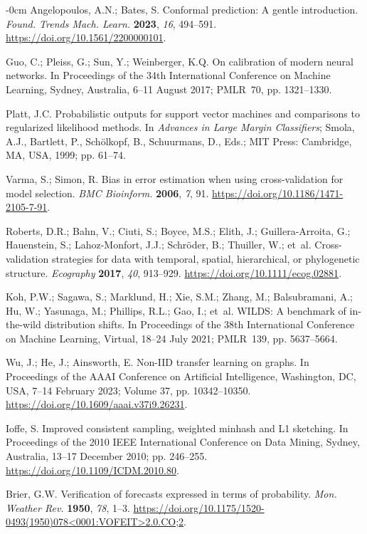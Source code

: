 \documentclass[10pt,a4paper]{article}
\newlength{\extralength}\setlength{\extralength}{3.7cm}
\renewenvironment{thebibliography}[1]{\nolinenumbers\small\list{\arabic{enumiv}.}{\settowidth\labelwidth{999.}\leftmargin\labelwidth\advance\leftmargin\labelsep\usecounter{enumiv}\itemsep 0pt}\sloppy}{\endlist}
\begin{document}
\begin{adjustwidth}{-\extralength}{0cm}
\begin{thebibliography}{999}
 Angelopoulos, A.N.; Bates, S. Conformal prediction: A gentle introduction. \emph{Found. Trends Mach. Learn.} \textbf{2023}, \emph{16}, 494--591. \url{https://doi.org/10.1561/2200000101}.

 Guo, C.; Pleiss, G.; Sun, Y.; Weinberger, K.Q. On calibration of modern neural networks. In Proceedings of the 34th International Conference on Machine Learning, Sydney, Australia, 6--11 August 2017; PMLR~70, pp. 1321--1330.

 Platt, J.C. Probabilistic outputs for support vector machines and comparisons to regularized likelihood methods. In \emph{Advances in Large Margin Classifiers}; Smola, A.J., Bartlett, P., Sch\"{o}lkopf, B., Schuurmans, D., Eds.; MIT Press: Cambridge, MA, USA, 1999; pp. 61--74.

 Varma, S.; Simon, R. Bias in error estimation when using cross-validation for model selection. \emph{BMC Bioinform.} \textbf{2006}, \emph{7}, 91. \url{https://doi.org/10.1186/1471-2105-7-91}.

 Roberts, D.R.; Bahn, V.; Ciuti, S.; Boyce, M.S.; Elith, J.; Guillera-Arroita, G.; Hauenstein, S.; Lahoz-Monfort, J.J.; Schr\"{o}der, B.; Thuiller, W.; et~al. Cross-validation strategies for data with temporal, spatial, hierarchical, or phylogenetic structure. \emph{Ecography} \textbf{2017}, \emph{40}, 913--929. \url{https://doi.org/10.1111/ecog.02881}.

 Koh, P.W.; Sagawa, S.; Marklund, H.; Xie, S.M.; Zhang, M.; Balsubramani, A.; Hu, W.; Yasunaga, M.; Phillips, R.L.; Gao, I.; et~al. WILDS: A benchmark of in-the-wild distribution shifts. In Proceedings of the 38th International Conference on Machine Learning, Virtual, 18--24 July 2021; PMLR~139, pp. 5637--5664.

 Wu, J.; He, J.; Ainsworth, E. Non-IID transfer learning on graphs. In Proceedings of the AAAI Conference on Artificial Intelligence, Washington, DC, USA, 7--14 February 2023; Volume 37, pp. 10342--10350. \url{https://doi.org/10.1609/aaai.v37i9.26231}.

 Ioffe, S. Improved consistent sampling, weighted minhash and L1 sketching. In Proceedings of the 2010 IEEE International Conference on Data Mining, Sydney, Australia, 13--17 December 2010; pp. 246--255. \url{https://doi.org/10.1109/ICDM.2010.80}.

 Brier, G.W. Verification of forecasts expressed in terms of probability. \emph{Mon. Weather Rev.} \textbf{1950}, \emph{78}, 1--3. \url{https://doi.org/10.1175/1520-0493(1950)078<0001:VOFEIT>2.0.CO;2}.


\end{thebibliography}
\end{adjustwidth}
\end{document}
